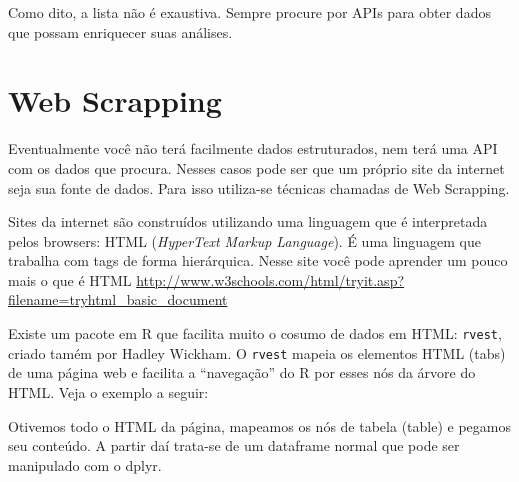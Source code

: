 \documentclass[]{book}
\newenvironment{Shaded}{\begin{snugshade}}{\end{snugshade}}
\newcommand{\KeywordTok}[1]{\textcolor[rgb]{0.13,0.29,0.53}{\textbf{#1}}}
\newcommand{\DataTypeTok}[1]{\textcolor[rgb]{0.13,0.29,0.53}{#1}}
\newcommand{\DecValTok}[1]{\textcolor[rgb]{0.00,0.00,0.81}{#1}}
\newcommand{\StringTok}[1]{\textcolor[rgb]{0.31,0.60,0.02}{#1}}
\newcommand{\OperatorTok}[1]{\textcolor[rgb]{0.81,0.36,0.00}{\textbf{#1}}}
\newcommand{\NormalTok}[1]{#1}
\begin{document}
Como dito, a lista não é exaustiva. Sempre procure por APIs para obter
dados que possam enriquecer suas análises.

\section{Web Scrapping}\label{web-scrapping}

Eventualmente você não terá facilmente dados estruturados, nem terá uma
API com os dados que procura. Nesses casos pode ser que um próprio site
da internet seja sua fonte de dados. Para isso utiliza-se técnicas
chamadas de Web Scrapping.

Sites da internet são construídos utilizando uma linguagem que é
interpretada pelos browsers: HTML (\emph{HyperText Markup Language}). É
uma linguagem que trabalha com tags de forma hierárquica. Nesse site
você pode aprender um pouco mais o que é HTML
\url{http://www.w3schools.com/html/tryit.asp?filename=tryhtml_basic_document}

Existe um pacote em R que facilita muito o cosumo de dados em HTML:
\texttt{rvest}, criado tamém por Hadley Wickham. O \texttt{rvest} mapeia
os elementos HTML (tabs) de uma página web e facilita a ``navegação'' do
R por esses nós da árvore do HTML. Veja o exemplo a seguir:

\begin{Shaded}
\end{Shaded}

Otivemos todo o HTML da página, mapeamos os nós de tabela (table) e
pegamos seu conteúdo. A partir daí trata-se de um dataframe normal que
pode ser manipulado com o dplyr.
\end{document}
